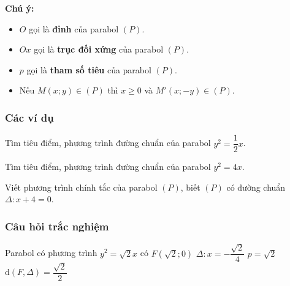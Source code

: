\begin{note}
	\textbf{Chú ý:}
	\begin{itemize}
		\item $O$ gọi là \textbf{đỉnh} của parabol $(P)$.
		\item $Ox$ gọi là \textbf{trục đối xứng} của parabol $(P)$.
		\item $p$ gọi là \textbf{tham số tiêu} của parabol $(P)$.
		\item Nếu $M(x;y)\in (P)$ thì $x\ge 0$ và $M'(x;-y)\in (P)$.
	\end{itemize}
\end{note}
\subsubsection{Các ví dụ}
\begin{vd}
	\begin{listEX}
		\item Tìm tiêu điểm, phương trình đường chuẩn của parabol $y^2 =\dfrac{1}{2} x$.
		\item Tìm tiêu điểm, phương trình đường chuẩn của parabol $y^2 = 4x$.
	\end{listEX}
\end{vd}
\begin{vd}
	Viết phương trình chính tắc của parabol $(P)$, biết $(P)$ có đường chuẩn $\Delta: x+4=0$.
\end{vd}
\subsubsection{Câu hỏi trắc nghiệm}
\setcounter{ex}{0}
\begin{ex}%
	Parabol có phương trình  $y^2 = \sqrt{2}x$ có
	\choice
	{$F(\sqrt{2};0)$}
	{\True $\Delta \colon x=-\dfrac{\sqrt{2}}{4}$}
	{$p=\sqrt{2}$}
	{$\mathrm{d}(F, \Delta)=\dfrac{\sqrt{2}}{2}$}
\end{ex}

